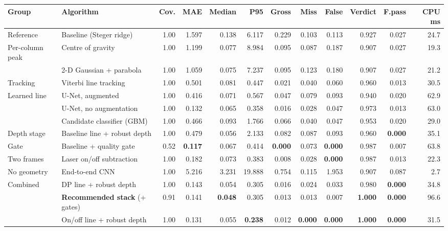 \begin{tabular}{@{}llrrrrrrrrrr@{}}
\toprule
Group & Algorithm & Cov. & MAE & Median & P95 & Gross & Miss & False & Verdict & F.pass & CPU ms \\
\midrule
Reference & Baseline (Steger ridge) & 1.00 & 1.597 & 0.138 & 6.117 & 0.229 & 0.103 & 0.113 & 0.927 & 0.027 & 24.7 \\
\addlinespace[2pt]
Per-column peak & Centre of gravity & 1.00 & 1.199 & 0.077 & 8.984 & 0.095 & 0.087 & 0.187 & 0.907 & 0.027 & 19.3 \\
 & 2-D Gaussian + parabola & 1.00 & 1.059 & 0.075 & 7.237 & 0.095 & 0.123 & 0.180 & 0.907 & 0.027 & 21.2 \\
\addlinespace[2pt]
Tracking & Viterbi line tracking & 1.00 & 0.501 & 0.081 & 0.447 & 0.021 & 0.040 & 0.060 & 0.960 & 0.013 & 30.5 \\
\addlinespace[2pt]
Learned line & U-Net, augmented & 1.00 & 0.416 & 0.071 & 0.567 & 0.047 & 0.079 & 0.093 & 0.940 & 0.020 & 62.9 \\
 & U-Net, no augmentation & 1.00 & 0.132 & 0.065 & 0.358 & 0.016 & 0.028 & 0.047 & 0.973 & 0.013 & 63.0 \\
 & Candidate classifier (GBM) & 1.00 & 0.466 & 0.093 & 1.766 & 0.066 & 0.040 & 0.047 & 0.953 & 0.020 & 29.0 \\
\addlinespace[2pt]
Depth stage & Baseline line + robust depth & 1.00 & 0.479 & 0.056 & 2.133 & 0.082 & 0.087 & 0.093 & 0.960 & \textbf{0.000} & 35.1 \\
\addlinespace[2pt]
Gate & Baseline + quality gate & 0.52 & \textbf{0.117} & 0.067 & 0.414 & \textbf{0.000} & 0.073 & \textbf{0.000} & 0.987 & 0.007 & 63.8 \\
\addlinespace[2pt]
Two frames & Laser on/off subtraction & 1.00 & 0.182 & 0.073 & 0.383 & 0.008 & 0.028 & \textbf{0.000} & 0.987 & 0.013 & 22.3 \\
\addlinespace[2pt]
No geometry & End-to-end CNN & 1.00 & 5.216 & 3.231 & 19.888 & 0.754 & 0.115 & 1.953 & 0.907 & 0.087 & 2.7 \\
\addlinespace[2pt]
Combined & DP line + robust depth & 1.00 & 0.143 & 0.054 & 0.305 & 0.016 & 0.024 & 0.033 & 0.980 & \textbf{0.000} & 34.8 \\
 & \textbf{Recommended stack} (+ gates) & 0.91 & 0.141 & \textbf{0.048} & 0.305 & 0.013 & 0.013 & 0.007 & \textbf{1.000} & \textbf{0.000} & 96.6 \\
 & On/off line + robust depth & 1.00 & 0.131 & 0.055 & \textbf{0.238} & 0.012 & \textbf{0.000} & \textbf{0.000} & \textbf{1.000} & \textbf{0.000} & 31.5 \\
\bottomrule
\end{tabular}

